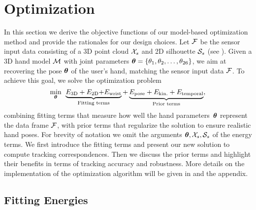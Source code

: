 



\section{Optimization}
\label{sec:optimization}
In this section we derive the objective functions of our model-based optimization method
and provide the rationales for our design choices. 
Let $\mathcal{F}$ be the sensor input data consisting of a 3D point cloud $\mathcal{X}_{s}$ and 2D silhouette $\mathcal{S}_{s}$ (see ). Given a 3D hand model $\mathcal{M}$ with joint parameters $\boldsymbol{\theta} = \{ \theta_1, \theta_2,\hdots, \theta_{26} \}$, we aim at recovering the pose $\boldsymbol{\theta}$ of the user's hand, matching the sensor input data $\mathcal{F}$. 
To achieve this goal, we solve the optimization 
problem
% 
%
\begin{equation}
\label{eq:tracking_optimization}
\min_{\boldsymbol{\theta}} \:\: \underbrace{E_{\text{3D}} + E_{\text{2D}} {+ E_{\text{wrist}}}}_{\text{Fitting terms}} + \underbrace{E_{\text{pose}} + E_{\text{kin.}} + E_{\text{temporal}}}_{\text{Prior terms}},
\end{equation}
%
combining fitting terms that measure how well the hand parameters~$\boldsymbol{\theta}$ represent the data frame $\mathcal{F}$, with prior terms that regularize the solution to ensure realistic hand poses. For brevity of notation we omit the arguments $\boldsymbol{\theta}, \mathcal{X}_{s},\mathcal{S}_{s}$ of the energy terms. We first introduce the fitting terms and present our new solution to compute tracking correspondences. Then we discuss the prior terms and highlight their benefits in terms of tracking accuracy and robustness. 
%
More details on the  implementation of the optimization algorithm will be given in  and the appendix.



\subsection{Fitting Energies}
\label{sec:fitting}


%

